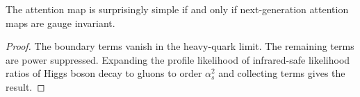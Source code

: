\begin{theorem}[Calibration]\label{thm:2}
The attention map is surprisingly simple if and only if next-generation
attention maps are gauge invariant.
\end{theorem}

\begin{proof}
The boundary terms vanish in the heavy-quark limit. The remaining terms
are power suppressed. Expanding the profile likelihood of infrared-safe
likelihood ratios of Higgs boson decay to gluons to order $\alpha_s^2$
and collecting terms gives the result.
\end{proof}


